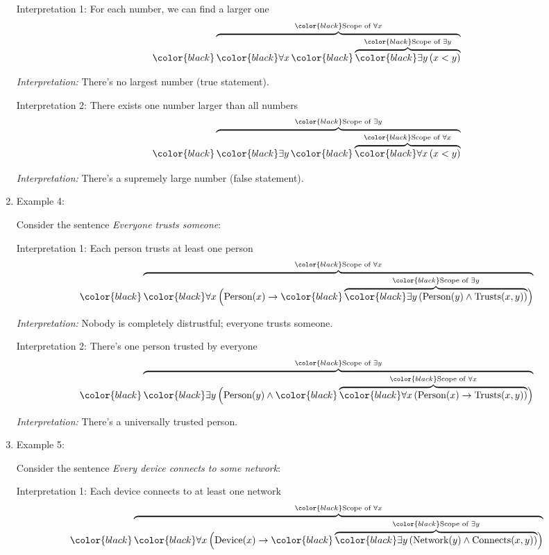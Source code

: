 \begin{enumerate}
  Interpretation 1: For each number, we can find a larger one \[
   {\color{black}\overbrace{\color{black}\forall x \,
   {\color{black}\overbrace{\color{black}\exists y \, (x < y)}^{\color{black}\text{Scope of } \exists y}} 
   }^{\color{black}\text{Scope of } \forall x}}
   \]

  \emph{Interpretation:} There's no largest number (true statement).

  Interpretation 2: There exists one number larger than all numbers \[
   {\color{black}\overbrace{\color{black}\exists y \,
   {\color{black}\overbrace{\color{black}\forall x \, (x < y)}^{\color{black}\text{Scope of } \forall x}}
   }^{\color{black}\text{Scope of } \exists y}}
   \]

  \emph{Interpretation:} There's a supremely large number (false
  statement).
\item
  Example 4:

  Consider the sentence \emph{Everyone trusts someone}:

  Interpretation 1: Each person trusts at least one person \[
   {\color{black}\overbrace{\color{black}\forall x \, \Big(
   \text{Person}(x) \rightarrow
   {\color{black}\overbrace{\color{black}\exists y \, (\text{Person}(y) \wedge \text{Trusts}(x,y))}^{\color{black}\text{Scope of } \exists y}}
   \Big)}^{\color{black}\text{Scope of } \forall x}}
   \]

  \emph{Interpretation:} Nobody is completely distrustful; everyone
  trusts someone.

  Interpretation 2: There's one person trusted by everyone \[
   {\color{black}\overbrace{\color{black}\exists y \,
   \Big(
   \text{Person}(y) \wedge
   {\color{black}\overbrace{\color{black}\forall x \, 
   ( \text{Person}(x) \rightarrow \text{Trusts}(x,y) )
   }^{\color{black}\text{Scope of } \forall x}}
   \Big)
   }^{\color{black}\text{Scope of } \exists y}}
   \]

  \emph{Interpretation:} There's a universally trusted person.
\item
  Example 5:

  Consider the sentence \emph{Every device connects to some network}:

  Interpretation 1: Each device connects to at least one network \[
   {\color{black}\overbrace{\color{black}\forall x \, \Big(
   \text{Device}(x) \rightarrow
   {\color{black}\overbrace{\color{black}\exists y \, (\text{Network}(y) \wedge \text{Connects}(x,y))}^{\color{black}\text{Scope of } \exists y}}
   \Big)}^{\color{black}\text{Scope of } \forall x}}
   \]


\end{enumerate}
